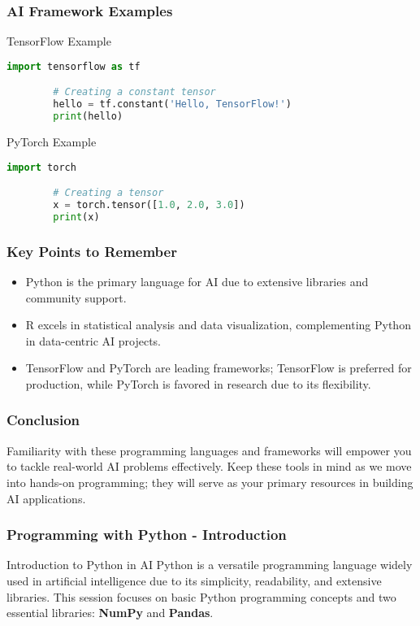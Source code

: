 \documentclass{beamer}
\begin{document}
\begin{frame}[fragile]
    \frametitle{AI Framework Examples}
    \begin{block}{TensorFlow Example}
        \begin{lstlisting}[language=Python]
        import tensorflow as tf

        # Creating a constant tensor
        hello = tf.constant('Hello, TensorFlow!')
        print(hello)
        \end{lstlisting}
    \end{block}

    \begin{block}{PyTorch Example}
        \begin{lstlisting}[language=Python]
        import torch

        # Creating a tensor
        x = torch.tensor([1.0, 2.0, 3.0])
        print(x)
        \end{lstlisting}
    \end{block}
\end{frame}

\begin{frame}
    \frametitle{Key Points to Remember}
    \begin{itemize}
        \item Python is the primary language for AI due to extensive libraries and community support.
        \item R excels in statistical analysis and data visualization, complementing Python in data-centric AI projects.
        \item TensorFlow and PyTorch are leading frameworks; TensorFlow is preferred for production, while PyTorch is favored in research due to its flexibility.
    \end{itemize}
\end{frame}

\begin{frame}
    \frametitle{Conclusion}
    Familiarity with these programming languages and frameworks will empower you to tackle real-world AI problems effectively. Keep these tools in mind as we move into hands-on programming; they will serve as your primary resources in building AI applications.
\end{frame}

\begin{frame}[fragile]
    \frametitle{Programming with Python - Introduction}
    \begin{block}{Introduction to Python in AI}
        Python is a versatile programming language widely used in artificial intelligence due to its simplicity, readability, and extensive libraries. This session focuses on basic Python programming concepts and two essential libraries: \textbf{NumPy} and \textbf{Pandas}.
    \end{block}
\end{frame}
\end{document}
